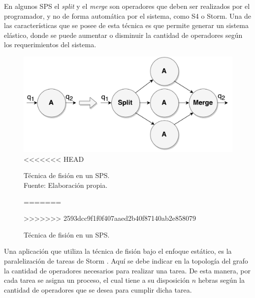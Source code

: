 En algunos SPS el \textit{split} y el \textit{merge} son operadores que deben ser realizados por el programador, y no de forma autom\'atica por el sistema, como S4 o Storm. Una de las caracter\'isticas que se posee de esta t\'ecnica es que permite generar un sistema el\'astico, donde se puede aumentar o disminuir la cantidad de operadores seg\'un los requerimientos del sistema.

\begin{figure}[!ht]
	\centering
	\includegraphics[scale=0.4]{images/Fision.pdf}
<<<<<<< HEAD
	\caption[Técnica de fisión en un SPS.]{Técnica de fisión en un SPS.\\Fuente: Elaboración propia.}
=======
	\caption{T\'ecnica de fisi\'on en un SPS.}
>>>>>>> 2593dcc9f1f0f407aaed2b40f87140ab2e858079
	\label{fig:fision}
\end{figure}



Una aplicaci\'on que utiliza la t\'ecnica de fisi\'on bajo el enfoque est\'atico, es la paralelizaci\'on de tareas de Storm \citep{bookstorm}. Aqu\'i se debe indicar en la topolog\'ia del grafo la cantidad de operadores necesarios para realizar una tarea. De esta manera, por cada tarea se asigna un proceso, el cual tiene a su disposici\'on $n$ hebras seg\'un la cantidad de operadores que se desea para cumplir dicha tarea.


